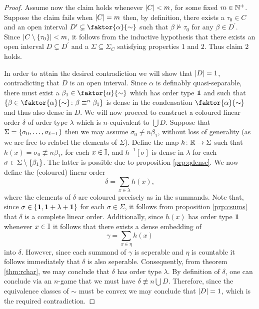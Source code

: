 \begin{proof}
		Assume now the claim holds whenever $\left\lvert C\right\rvert<m$, for some fixed $m\in\mathbb{N}^{+}$.  Suppose the claim fails when $\left\lvert C\right\rvert=m$ then, by definition, there exists a $\tau_0\in C$ and an open interval $D^\prime\subsetneq\faktor{\alpha}{\sim}$ such that $\beta\not\models\tau_0$ for any $\beta\in D^\prime$.  Since $\left\lvert C\setminus\left\lbrace \tau_0\right\rbrace\right\rvert<m$, it follows from the inductive hypothesis that there exists an open interval $D\subsetneq D^\prime$ and a $\Sigma\subseteq\Sigma_C$ satisfying properties 1 and 2.   Thus claim 2 holds.

		\smallskip	In order to attain the desired contradiction we will show that $\left\lvert D\right\rvert=1$, contradicting that $D$ is an open interval.  Since $\alpha$ is definably quasi-separable, there must exist a $\beta_1\in\faktor{\alpha}{\sim}$ which has order type $\mathbf{1}$ and such that $\setbuild{\beta\in\faktor{\alpha}{\sim}}{\beta\nequiv{n}\beta_1}$ is dense in the condensation $\faktor{\alpha}{\sim}$ and thus also dense in $D$.  We will now proceed to construct a coloured linear order $\delta$ of order type $\lambda$ which is $n$-equivalent to $\bigcup D$.  Suppose that $\Sigma=\left\lbrace \sigma_0,\dotsc,\sigma_{\ell-1}\right\rbrace$ then we may assume $\sigma_0\nequiv{n}\beta_1$, without loss of generality (as we are free to relabel the elements of $\Sigma$).  Define the map $h\colon\mathbb{R}\to\Sigma$ such that $h(x)=\sigma_0\nequiv{n}\beta_1$, for each $x\in\mathbb{I}$, and $h^{-1}[\sigma]$ is dense in $\lambda$ for each $\sigma\in\Sigma\setminus\left\lbrace \beta_1\right\rbrace$.  The latter is possible due to proposition \ref{prp:qdense}.  We now define the (coloured) linear order
		\begin{equation}
			\delta=\sum_{x\in\lambda}h(x),
		\end{equation}
		where the elements of $\delta$ are coloured precisely as in the summands.  Note that, since $\sigma\in\left\lbrace \mathbf{1},\mathbf{1}+\lambda+\mathbf{1}\right\rbrace$ for each $\sigma\in\Sigma$, it follows from proposition \ref{prp:csums} that $\delta$ is a complete linear order.  Additionally, since $h(x)$ has order type $\mathbf{1}$ whenever $x\in\mathbb{I}$ it follows that there exists a dense embedding of
		\begin{equation}
			\gamma=\sum_{x\in\eta}h(x)
		\end{equation}
		into $\delta$.  However, since each summand of $\gamma$ is seperable and $\eta$ is countable it follows immediately that $\delta$ is also seperable.  Consequently, from theorem \ref{thm:rchar}, we may conclude that $\delta$ has order type $\lambda$.  By definition of $\delta$, one can conclude via an $n$-game that we must have $\delta\nequiv{n}\bigcup D$.  Therefore, since the equivalence classes of $\sim$ must be convex we may conclude that $\left\lvert D\right\rvert=1$, which is the required contradiction.
	\end{proof}

